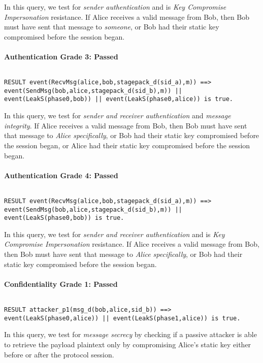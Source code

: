 In this query, we test for \emph{sender authentication} and is \emph{Key Compromise Impersonation} resistance. If Alice receives a valid message from Bob, then Bob must have sent that message to \emph{someone}, or Bob had their static key compromised before the session began.


\paragraph{Authentication Grade 3: Passed}$ $
\begin{lstlisting}
RESULT event(RecvMsg(alice,bob,stagepack_d(sid_a),m)) ==> event(SendMsg(bob,alice,stagepack_d(sid_b),m)) || event(LeakS(phase0,bob)) || event(LeakS(phase0,alice)) is true.
\end{lstlisting}

In this query, we test for \emph{sender and receiver authentication} and \emph{message integrity}. If Alice receives a valid message from Bob, then Bob must have sent that message to \emph{Alice specifically}, or Bob had their static key compromised before the session began, or Alice had their static key compromised before the session began.


\paragraph{Authentication Grade 4: Passed}$ $
\begin{lstlisting}
RESULT event(RecvMsg(alice,bob,stagepack_d(sid_a),m)) ==> event(SendMsg(bob,alice,stagepack_d(sid_b),m)) || event(LeakS(phase0,bob)) is true.
\end{lstlisting}

In this query, we test for \emph{sender and receiver authentication} and is \emph{Key Compromise Impersonation} resistance. If Alice receives a valid message from Bob, then Bob must have sent that message to \emph{Alice specifically}, or Bob had their static key compromised before the session began.


\paragraph{Confidentiality Grade 1: Passed}$ $
\begin{lstlisting}
RESULT attacker_p1(msg_d(bob,alice,sid_b)) ==> event(LeakS(phase0,alice)) || event(LeakS(phase1,alice)) is true.
\end{lstlisting}

In this query, we test for \emph{message secrecy} by checking if a passive attacker is able to retrieve the payload plaintext only by compromising Alice's static key either before or after the protocol session.


